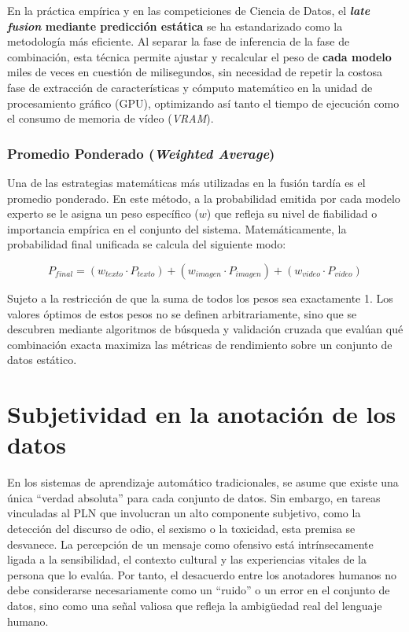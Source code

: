 En la práctica empírica y en las competiciones de Ciencia de Datos, el \textbf{\textit{late fusion} mediante predicción estática} se ha estandarizado como la metodología más eficiente. Al separar la fase de inferencia de la fase de combinación, esta técnica permite ajustar y recalcular el peso de \textbf{cada modelo} miles de veces en cuestión de milisegundos, sin necesidad de repetir la costosa fase de extracción de características y cómputo matemático en la unidad de procesamiento gráfico (GPU), optimizando así tanto el tiempo de ejecución como el consumo de memoria de vídeo (\textit{VRAM}).


\subsubsection*{Promedio Ponderado (\textit{Weighted Average})}
\label{subsubsec:PromedioPonderado}
Una de las estrategias matemáticas más utilizadas en la fusión tardía es el promedio ponderado. En este método, a la probabilidad emitida por cada modelo experto se le asigna un peso específico ($w$) que refleja su nivel de fiabilidad o importancia empírica en el conjunto del sistema. Matemáticamente, la probabilidad final unificada se calcula del siguiente modo: 

\begin{equation}
    P_{final} = (w_{texto} \cdot P_{texto}) + (w_{imagen} \cdot P_{imagen}) + (w_{video} \cdot P_{video})
    \label{eq:PesosEnsemble}
\end{equation}

Sujeto a la restricción de que la suma de todos los pesos sea exactamente 1. Los valores óptimos de estos pesos no se definen arbitrariamente, sino que se descubren mediante algoritmos de búsqueda y validación cruzada que evalúan qué combinación exacta maximiza las métricas de rendimiento sobre un conjunto de datos estático. 

\section{Subjetividad en la anotación de los datos}
\label{sec:SubjetividadEnLaAnotacionDeLosDatos}
En los sistemas de aprendizaje automático tradicionales, se asume que existe una única ``verdad absoluta'' para cada conjunto de datos. Sin embargo, en tareas vinculadas al PLN que involucran un alto componente subjetivo, como la detección del discurso de odio, el sexismo o la toxicidad, esta premisa se desvanece. La percepción de un mensaje como ofensivo está intrínsecamente ligada a la sensibilidad, el contexto cultural y las experiencias vitales de la persona que lo evalúa. Por tanto, el desacuerdo entre los anotadores humanos no debe considerarse necesariamente como un ``ruido'' o un error en el conjunto de datos, sino como una señal valiosa que refleja la ambigüedad real del lenguaje humano. 

